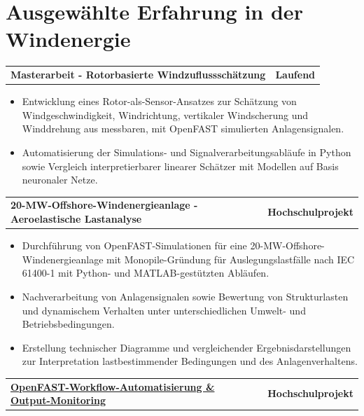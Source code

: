 \documentclass[10pt,a4paper]{article}
\makeatletter
\newcommand{\cvproject}[2]{%
  \begin{tabularx}{\linewidth}{@{}Xr@{}}
    \textbf{#1} & \textbf{#2}
  \end{tabularx}
  \vspace{0.08em}
}
\makeatother
\begin{document}
\section{Ausgewählte Erfahrung in der Windenergie}
\cvproject{Masterarbeit - Rotorbasierte Windzuflussschätzung}{Laufend}
\begin{itemize}
  \item Entwicklung eines Rotor-als-Sensor-Ansatzes zur Schätzung von Windgeschwindigkeit, Windrichtung, vertikaler Windscherung und Winddrehung aus messbaren, mit OpenFAST simulierten Anlagensignalen.

  \item Automatisierung der Simulations- und Signalverarbeitungsabläufe in Python sowie Vergleich interpretierbarer linearer Schätzer mit Modellen auf Basis neuronaler Netze.
\end{itemize}
\vspace{1pt}
\cvproject{20-MW-Offshore-Windenergieanlage - Aeroelastische Lastanalyse}{Hochschulprojekt}
\begin{itemize}
  \item Durchführung von OpenFAST-Simulationen für eine 20-MW-Offshore-Windenergieanlage mit Monopile-Gründung für Auslegungslastfälle nach IEC 61400-1 mit Python- und MATLAB-gestützten Abläufen.
  \item Nachverarbeitung von Anlagensignalen sowie Bewertung von Strukturlasten und dynamischem Verhalten unter unterschiedlichen Umwelt- und Betriebsbedingungen.
  \item Erstellung technischer Diagramme und vergleichender Ergebnisdarstellungen zur Interpretation lastbestimmender Bedingungen und des Anlagenverhaltens.
\end{itemize}
\vspace{1pt}
\cvproject
  {\href{REPLACEPROJECTLINK}
  {OpenFAST-Workflow-Automatisierung \& Output-Monitoring}}
  {Hochschulprojekt}
\end{document}
